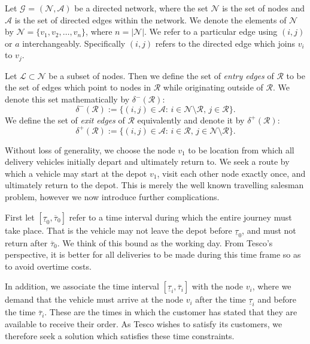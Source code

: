Let $\mathcal{G}$ = $(\mathcal{N}, \mathcal{A})$ be a directed network, where the set $\mathcal{N}$ is the set of nodes and $\mathcal{A}$ is the set of directed edges within the network. We denote the elements of $\mathcal{N}$ by $\mathcal{N} = \{v_1, v_2, \ldots, v_n\}$, where $n = |\mathcal{N}|$. We refer to a particular edge using $(i,j)$ or $a$ interchangeably. Specifically $(i,j)$ refers to the directed edge which joins $v_i$ to $v_j$. 

\begin{definition}
	Let $\mathcal{L} \subset \mathcal{N}$ be a subset of nodes. Then we define the set of \textit{entry edges} of $\mathcal{R}$ to be the set of edges which point to nodes in $\mathcal{R}$ while originating outside of $\mathcal{R}$. We denote this set mathematically by $\delta^-(\mathcal{R})$:
	\begin{equation}
	\label{def:entry_edges}
	\delta^-(\mathcal{R}) := \{(i,j)\in \mathcal{A}:\,i \in \mathcal{N}\setminus \mathcal{R}, \, j \in \mathcal{R}\}.
	\end{equation}
	We define the set of \textit{exit edges} of $\mathcal{R}$ equivalently and denote it by $\delta^+(\mathcal{R})$:
	\begin{equation}
	\label{def:exit_edges}
	\delta^+(\mathcal{R}) := \{(i,j)\in \mathcal{A}:\,i \in \mathcal{R}, \, j \in \mathcal{N}\setminus \mathcal{R}\}.
	\end{equation}
\end{definition}

Without loss of generality, we choose the node $v_1$ to be location from which all delivery vehicles initially depart and ultimately return to. We seek a route by which a vehicle may start at the depot $v_1$, visit each other node exactly once, and ultimately return to the depot. This is merely the well known travelling salesman problem, however we now introduce further complications.

First let $[\underline{\tau}_0, \overline{\tau}_0]$ refer to a time interval during which the entire journey must take place. That is the vehicle may not leave the depot before $\underline{\tau}_0$, and must not return after $\overline{\tau}_0$. We think of this bound as the working day. From Tesco's perspective, it is better for all deliveries to be made during this time frame so as to avoid overtime costs.

In addition, we associate the time interval $[\underline{\tau}_i, \overline{\tau}_i]$ with the node $v_i$, where we demand that the vehicle must arrive at the node $v_i$ after the time $\underline{\tau}_i$ and before the time $\overline{\tau}_i$. These are the times in which the customer has stated that they are available to receive their order. As Tesco wishes to satisfy its customers, we therefore seek a solution which satisfies these time constraints.

